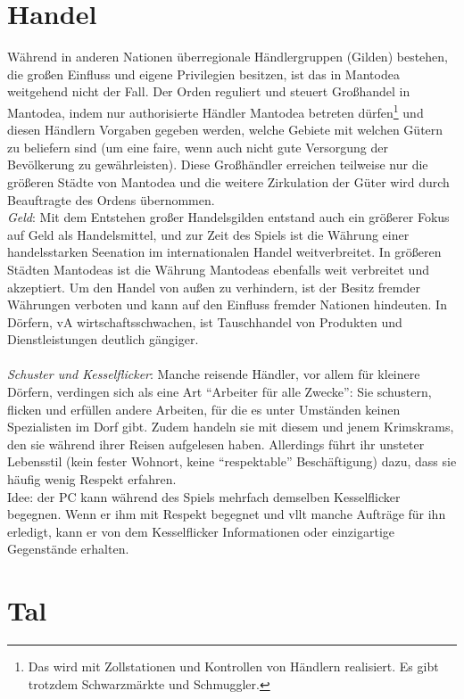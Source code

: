 \section{Handel}
Während in anderen Nationen überregionale Händlergruppen (Gilden) bestehen, die großen Einfluss und eigene Privilegien besitzen, ist das in Mantodea weitgehend nicht der Fall. 
Der Orden reguliert und steuert Großhandel in Mantodea, indem nur authorisierte Händler Mantodea betreten dürfen\footnote{Das wird mit Zollstationen und Kontrollen von Händlern realisiert. Es gibt trotzdem Schwarzmärkte und Schmuggler.} 
und diesen Händlern Vorgaben gegeben werden, welche Gebiete mit welchen Gütern zu beliefern sind (um eine faire, wenn auch nicht gute Versorgung der Bevölkerung zu gewährleisten). 
Diese Großhändler erreichen teilweise nur die größeren Städte von Mantodea und die weitere Zirkulation der Güter wird durch Beauftragte des Ordens übernommen.\\
\emph{Geld}: Mit dem Entstehen großer Handelsgilden entstand auch ein größerer Fokus auf Geld als Handelsmittel, und zur Zeit des Spiels ist die Währung einer handelsstarken Seenation im internationalen Handel weitverbreitet. 
In größeren Städten Mantodeas ist die Währung Mantodeas ebenfalls weit verbreitet und akzeptiert. 
Um den Handel von außen zu verhindern, ist der Besitz fremder Währungen verboten und kann auf den Einfluss fremder Nationen hindeuten. 
In Dörfern, vA wirtschaftsschwachen, ist Tauschhandel von Produkten und Dienstleistungen deutlich gängiger.\\~\\
\emph{Schuster und Kesselflicker}: Manche reisende Händler, vor allem für kleinere Dörfern, verdingen sich als eine Art ``Arbeiter für alle Zwecke'': 
Sie schustern, flicken und erfüllen andere Arbeiten, für die es unter Umständen keinen Spezialisten im Dorf gibt. 
Zudem handeln sie mit diesem und jenem Krimskrams, den sie während ihrer Reisen aufgelesen haben. 
Allerdings führt ihr unsteter Lebensstil (kein fester Wohnort, keine ``respektable'' Beschäftigung) dazu, dass sie häufig wenig Respekt erfahren.\\
Idee: der PC kann während des Spiels mehrfach demselben Kesselflicker begegnen. Wenn er ihm mit Respekt begegnet und vllt manche Aufträge für ihn erledigt, kann er von dem 
Kesselflicker Informationen oder einzigartige Gegenstände erhalten.


\section{Tal}
